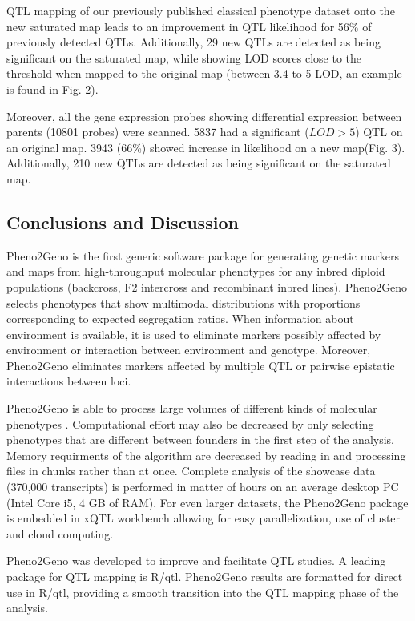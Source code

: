 QTL mapping of our previously published classical phenotype dataset \cite{Joosen:2011} onto the 
new saturated map leads to an improvement in QTL likelihood for 56\% of previously detected QTLs. 
Additionally, 29 new QTLs are detected as being significant on the saturated map, while showing 
LOD scores close to the threshold when mapped to the original map (between 3.4 to 5 LOD, an 
example is found in Fig. 2).

Moreover, all the gene expression probes showing differential expression between parents (10801 
probes) were scanned. 5837 had a significant ($LOD > 5$) QTL on an original map. 3943 (66\%) 
showed increase in likelihood on a new map(Fig. 3). Additionally, 210 new QTLs are detected as 
being significant on the saturated map.
  
\subsection{Conclusions and Discussion}
Pheno2Geno is the first generic software package for generating genetic markers and maps from 
high-throughput molecular phenotypes for any inbred diploid populations (backcross, F2 intercross 
and recombinant inbred lines). Pheno2Geno selects phenotypes that show multimodal distributions 
with proportions corresponding to expected segregation ratios. When information about environment 
is available, it is used to eliminate markers possibly affected by environment or interaction 
between environment and genotype. Moreover, Pheno2Geno eliminates markers affected by multiple 
QTL or pairwise epistatic interactions between loci.

Pheno2Geno is able to process large volumes of different kinds of molecular phenotypes 
\cite{Trelles:2011}. Computational effort may also be decreased by only selecting phenotypes 
that are different between founders in the first step of the analysis. Memory requirments of the 
algorithm are decreased by reading in and processing files in chunks rather than at once. 
Complete analysis of the showcase data (370,000 transcripts) is performed in matter of hours 
on an average desktop PC (Intel Core i5, 4 GB of RAM). For even larger datasets, the Pheno2Geno 
package is embedded in xQTL workbench \cite{Arends:2012a, arends:2012b} allowing for easy 
parallelization, use of cluster and cloud computing.\newline

Pheno2Geno was developed to improve and facilitate QTL studies. A leading package for QTL mapping 
is R/qtl. Pheno2Geno results are formatted for direct use in R/qtl, providing a smooth transition 
into the QTL mapping phase of the analysis. \newline

